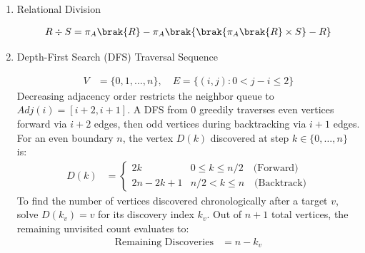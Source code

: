 \begin{enumerate}[label=\thesubsection.\arabic*, ref=\thesubsection.\theenumi]
	\item Relational Division
	
	\begin{align}
		R \div S = \pi_A\brak{R} - \pi_A\brak{\brak{\pi_A\brak{R} \times S} - R} \label{eq:DA2025-rel_div}
	\end{align}
	
	\item Depth-First Search (DFS) Traversal Sequence
	
	\begin{align}
		V &= \{0, 1, \dots, n\}, \quad E = \{(i, j) : 0 < j - i \le 2\} \label{eq:DA2025-dfs_graph_def}
	\end{align}
	\solution
	Decreasing adjacency order restricts the neighbor queue to $Adj(i) = [i+2, i+1]$. A DFS from $0$ greedily traverses even vertices forward via $i+2$ edges, then odd vertices during backtracking via $i+1$ edges. For an even boundary $n$, the vertex $D(k)$ discovered at step $k \in \{0, \dots, n\}$ is:
	\begin{align}
		D(k) &= {\begin{cases} 2k & 0 \le k \le n/2 \quad \text{(Forward)} \\ 2n - 2k + 1 & n/2 < k \le n \quad \text{(Backtrack)} \end{cases}} \label{eq:DA2025-dfs_seq}
	\end{align}
	To find the number of vertices discovered chronologically after a target $v$, solve $D(k_v) = v$ for its discovery index $k_v$. Out of $n+1$ total vertices, the remaining unvisited count evaluates to:
	\begin{align}
		\text{Remaining Discoveries} &= n - k_v \label{eq:DA2025-dfs_remaining}
	\end{align}
	
\end{enumerate}
